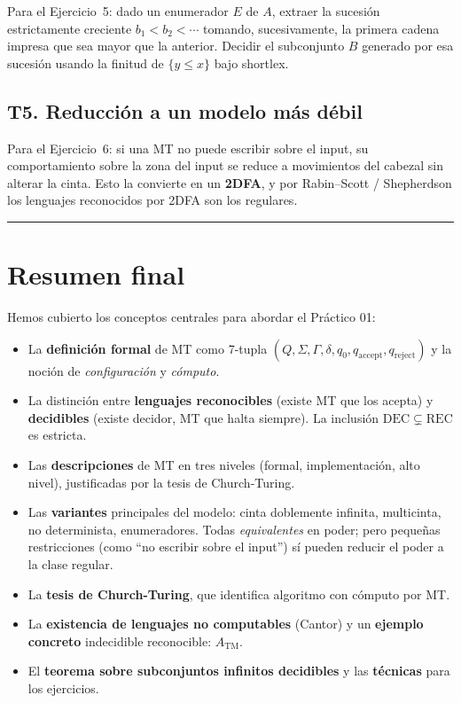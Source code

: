\documentclass[11pt,a4paper]{article}
\theoremstyle{plain}
\theoremstyle{definition}
\theoremstyle{remark}
\newcommand{\TM}{\mathrm{TM}}
\newcommand{\qaccept}{q_{\text{accept}}}
\newcommand{\qreject}{q_{\text{reject}}}
\newcommand{\rec}{\mathrm{REC}}
\newcommand{\dec}{\mathrm{DEC}}
\newcommand{\ATM}{A_{\TM}}
\begin{document}
Para el Ejercicio~5: dado un enumerador $E$ de $A$, extraer la sucesi\'on
estrictamente creciente $b_1<b_2<\cdots$ tomando, sucesivamente, la primera
cadena impresa que sea mayor que la anterior. Decidir el subconjunto $B$
generado por esa sucesi\'on usando la finitud de $\{y\le x\}$ bajo
shortlex.

\subsection*{T5. Reducci\'on a un modelo m\'as d\'ebil}

Para el Ejercicio~6: si una MT no puede escribir sobre el input, su
comportamiento sobre la zona del input se reduce a movimientos del cabezal
sin alterar la cinta. Esto la convierte en un \textbf{2DFA}, y por
Rabin--Scott / Shepherdson los lenguajes reconocidos por 2DFA son los
regulares.

\bigskip\hrule\bigskip

\section{Resumen final}
\label{sec:final}

Hemos cubierto los conceptos centrales para abordar el Pr\'actico 01:

\begin{itemize}
  \item La \textbf{definici\'on formal} de MT como 7-tupla
        $(Q,\Sigma,\Gamma,\delta,q_0,\qaccept,\qreject)$ y la noci\'on de
        \emph{configuraci\'on} y \emph{c\'omputo}.
  \item La distinci\'on entre \textbf{lenguajes reconocibles} (existe MT
        que los acepta) y \textbf{decidibles} (existe decidor, MT que halta
        siempre). La inclusi\'on $\dec\subsetneq\rec$ es estricta.
  \item Las \textbf{descripciones} de MT en tres niveles (formal,
        implementaci\'on, alto nivel), justificadas por la tesis de
        Church-Turing.
  \item Las \textbf{variantes} principales del modelo: cinta doblemente
        infinita, multicinta, no determinista, enumeradores. Todas
        \emph{equivalentes} en poder; pero peque\~nas restricciones (como
        ``no escribir sobre el input'') s\'i pueden reducir el poder a la
        clase regular.
  \item La \textbf{tesis de Church-Turing}, que identifica algoritmo con
        c\'omputo por MT.
  \item La \textbf{existencia de lenguajes no computables} (Cantor) y un
        \textbf{ejemplo concreto} indecidible reconocible: $\ATM$.
  \item El \textbf{teorema sobre subconjuntos infinitos decidibles} y las
        \textbf{t\'ecnicas} para los ejercicios.
\end{itemize}
\end{document}
